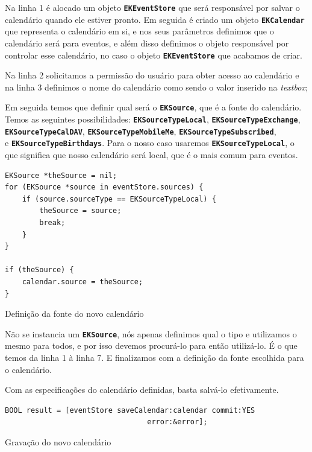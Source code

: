 \documentclass[a4paper,12pt,brazil,oneside]{book}
\begin{document}
Na linha 1 é alocado um objeto \texttt{\textbf{EKEventStore}} que será responsável por salvar o calendário quando ele estiver pronto. Em seguida é criado um objeto \texttt{\textbf{EKCalendar}} que representa o calendário em si, e nos seus parâmetros definimos que o calendário será para eventos, e além disso definimos o objeto responsável por controlar esse calendário, no caso o objeto \texttt{\textbf{EKEventStore}} que acabamos de criar.

Na linha 2 solicitamos a permissão do usuário para obter acesso ao calendário e na linha 3 definimos o nome do calendário como sendo o valor inserido na \emph{textbox};

Em seguida temos que definir qual será o \texttt{\textbf{EKSource}}, que é a fonte do calendário. Temos as seguintes possibilidades: \texttt{\textbf{EKSourceTypeLocal}}, \texttt{\textbf{EKSourceTypeExchange}},\\ \texttt{\textbf{EKSourceTypeCalDAV}}, \texttt{\textbf{EKSourceTypeMobileMe}}, \texttt{\textbf{EKSourceTypeSubscribed}},\\ e \texttt{\textbf{EKSourceTypeBirthdays}}. Para o nosso caso usaremos \texttt{\textbf{EKSourceTypeLocal}}, o que significa que nosso calendário será local, que é o mais comum para eventos.

\begin{listing}[H]
\begin{verbatim}
EKSource *theSource = nil;
for (EKSource *source in eventStore.sources) {
    if (source.sourceType == EKSourceTypeLocal) {
        theSource = source;
        break;
    }
}
    
if (theSource) {
    calendar.source = theSource;
}
\end{verbatim}
\caption{Definição da fonte do novo calendário}
\end{listing}

Não se instancia um \texttt{\textbf{EKSource}}, nós apenas definimos qual o tipo e utilizamos o mesmo para todos, e por isso devemos procurá-lo para então utilizá-lo. É o que temos da linha 1 à linha 7. E finalizamos com a definição da fonte escolhida para o calendário.

Com as especificações do calendário definidas, basta salvá-lo efetivamente.

\begin{listing}[H]
\begin{verbatim}
BOOL result = [eventStore saveCalendar:calendar commit:YES
                                 error:&error];
\end{verbatim}
\caption{Gravação do novo calendário}
\end{listing}
\end{document}
